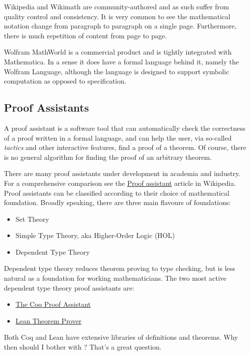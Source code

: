 \documentclass{amsart}
\begin{document}
Wikipedia and Wikimath are community-authored and as such suffer from quality control and consistency.
It is very common to see the mathematical notation change from paragraph to paragraph on a single page.
Furthermore, there is much repetition of content from page to page.

Wolfram MathWorld is a commercial product and is tightly integrated with Mathematica.
In a sense it does have a formal language behind it, namely the Wolfram Language,
although the language is designed to support symbolic computation
as opposed to specification.

\subsection{Proof Assistants}

A proof assistant is a software tool that can automatically check the correctness of a proof written in a formal language, 
and can help the user, via so-called \textit{tactics} and other interactive features, find a proof of a theorem.
Of course, there is no general algorithm for finding the proof of an arbitrary theorem.

There are many proof assistants under development in academia and industry.
For a comprehensive comparison see the \href{https://en.wikipedia.org/wiki/Proof_assistant}{Proof assistant} article in Wikipedia.
Proof assistants can be classified according to their choice of mathematical foundation. 
Broadly speaking, there are three main flavours of foundations:
\begin{itemize}
\item Set Theory
\item Simple Type Theory, aka Higher-Order Logic (HOL)
\item Dependent Type Theory
\end{itemize}

Dependent type theory reduces theorem proving to type checking, 
but is less natural as a foundation for working mathematicians.
The two most active dependent type theory proof assistants are:
\begin{itemize}
\item \href{https://coq.inria.fr}{The Coq Proof Assistant}
\item \href{https://leanprover.github.io}{Lean Theorem Prover}
\end{itemize}

Both Coq and Lean have extensive libraries of definitions and theorems.
Why then should I bother with \ZN?
That's a great question.
\end{document}
